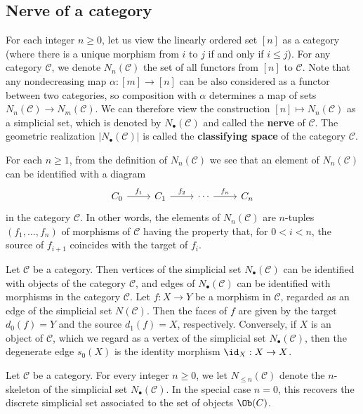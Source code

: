 \subsection{Nerve of a category}
For each integer $n\geq 0$, let us view the linearly ordered set $[n]$ as a category (where there is a unique morphism from $i$ to $j$ if and only if $i\leq j$). For any category $\mathcal{C}$, we denote $N_n(\mathcal{C})$ the set of all functors from $[n]$ to $\mathcal{C}$. Note that any nondecreasing map $\alpha:[m]\to [n]$ can be also considered as a functor between two categories, so composition with $\alpha$ determines a map of sets $N_n(\mathcal{C})\to N_m(\mathcal{C})$. We can therefore view the construction $[n]\mapsto N_n(\mathcal{C})$ as a simplicial set, which is denoted by $N_\bullet(\mathcal{C})$ and called the \textbf{nerve} of $\mathcal{C}$. The geometric realization $|N_\bullet(\mathcal{C})|$ is called the \textbf{classifying space} of the category $\mathcal{C}$.\par
For each $n\geq 1$, from the definition of $N_n(\mathcal{C})$ we see that an element of $N_n(\mathcal{C})$ can be identified with a diagram
\[\begin{tikzcd}
C_0\ar[r,"f_1"]&C_1\ar[r,"f_2"]&\cdots\ar[r,"f_n"]&C_n
\end{tikzcd}\]
in the category $\mathcal{C}$. In other words, the elements of $N_n(\mathcal{C})$ are $n$-tuples $(f_1,\dots,f_n)$ of morphisms of $\mathcal{C}$ having the property that, for $0<i<n$, the source of $f_{i+1}$ coincides with the target of $f_i$.
\begin{example}
Let $\mathcal{C}$ be a category. Then vertices of the simplicial set $N_\bullet(\mathcal{C})$ can be identified with objects of the category $\mathcal{C}$, and edges of $N_\bullet(\mathcal{C})$ can be identified with morphisms in the category $\mathcal{C}$. Let $f:X\to Y$ be a morphism in $\mathcal{C}$, regarded as an edge of the simplicial set $N(\mathcal{C})$. Then the faces of $f$ are given by the target $d_0(f)=Y$ and the source $d_1(f)=X$, respectively. Conversely, if $X$ is an object of $\mathcal{C}$, which we regard as a vertex of the simplicial set $N_\bullet(\mathcal{C})$, then the degenerate edge $s_0(X)$ is the identity morphism $\id_X:X\to X$.
\end{example}
\begin{example}
Let $\mathcal{C}$ be a category. For every integer $n\geq 0$, we let $N_{\leq n}(\mathcal{C})$ denote the $n$-skeleton of the simplicial set $N_\bullet(\mathcal{C})$. In the special case $n=0$, this recovers the discrete simplicial set associated to the set of objects $\Ob(C)$.
\end{example}
